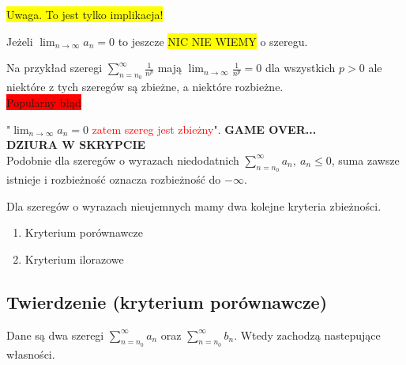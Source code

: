 \documentclass[12pt]{article}
\begin{document}
\colorbox{yellow}{Uwaga. To jest tylko implikacja!}

Jeżeli $ \lim_{n \to \infty} a_n = 0 $ to jeszcze \colorbox{yellow}{NIC NIE WIEMY} o szeregu.

Na przykład szeregi $ \sum\limits_{n = n_0}^{\infty} \frac{1}{n^p} $ mają $ \lim_{n \to \infty} \frac{1}{n^p} = 0 $
dla wszystkich $ p > 0 $ ale niektóre z tych szeregów są zbieżne, a niektóre rozbieżne. \\

\colorbox{red}{Popularny błąd}

"$\lim_{n \to \infty} a_n = 0 $ \textcolor{red}{zatem szereg jest zbieżny}". \textbf{GAME OVER...} \\

\textbf{DZIURA W SKRYPCIE} \\

Podobnie dla szeregów o wyrazach niedodatnich $ \sum\limits_{n = n_0}^{\infty} a_n, \ a_n \leq 0 $, suma zawsze istnieje
i rozbieżność oznacza rozbieżność do $-\infty$. \\

\pagebreak

Dla szeregów o wyrazach nieujemnych mamy dwa kolejne kryteria zbieżności.

\begin{enumerate}
    \item Kryterium porównawcze
    \item Kryterium ilorazowe \\
\end{enumerate} 

\subsection*{Twierdzenie (kryterium porównawcze)}

Dane są dwa szeregi $ \sum\limits_{n = n_0}^{\infty} a_n $ oraz $ \sum\limits_{n = n_0}^{\infty} b_n $. Wtedy zachodzą nastepujące
własności.
\end{document}
